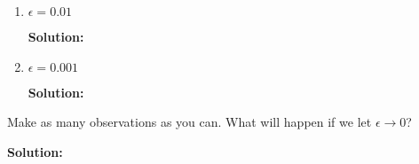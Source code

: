 \documentclass[12pt]{article}
\begin{document}
\begin{enumerate}
\begin{enumerate}
\begin{enumerate}
      {\bf Solution:}

      \item $\epsilon = 0.01$

      {\bf Solution:}

      \item $\epsilon = 0.001$

      {\bf Solution:}
    \end{enumerate}

  Make as many observations as you can. What will happen if we let $\epsilon \rightarrow 0$?

  {\bf Solution:}


\end{enumerate}

\end{enumerate}

\end{document}
